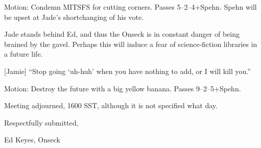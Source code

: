 \documentclass[12pt]{article}
\begin{document}
Motion: Condemn MITSFS for cutting corners.  Passes 5--2--4+Spehn.
Spehn will be upset at Jade's shortchanging of his vote.

Jade stands behind Ed, and thus the Onseck is in constant danger
of being brained by the gavel.  Perhaps this will induce a fear of
science-fiction libraries in a future life.

[Jamie] ``Stop going `uh-huh' when you have nothing to add, or
I will kill you.''

Motion: Destroy the future with a big yellow banana.  Passes
9--2--5+Spehn.

\vspace{12pt}

\noindent
Meeting adjourned, 1600 SST, although it is not specified what day.

\vspace{18pt}

\centerline{Respectfully submitted,}
\centerline{Ed Keyes, Onseck}
\end{document}
